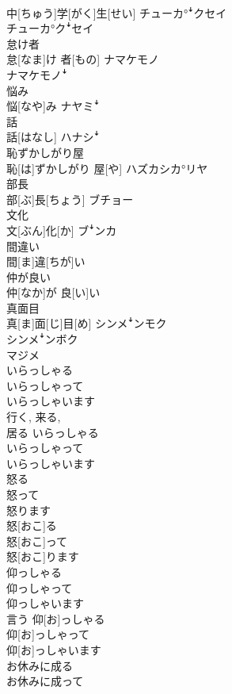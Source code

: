 \documentclass[8pt]{extreport}
\begin{document}
\begin{CJK}{UTF8}{min}
\\	中[ちゅう]学[がく]生[せい]	チューカ°ꜜクセイ 
\\	チューカ°クꜜセイ
\\	怠け者	
\\	怠[なま]け 者[もの]	ナマケモノ 
\\	ナマケモノꜜ
\\	悩み	
\\	悩[なや]み	ナヤミꜜ
\\	話	
\\	話[はなし]	ハナシꜜ
\\	恥ずかしがり屋	
\\	恥[は]ずかしがり 屋[や]	ハズカシカ°リヤ
\\	部長	
\\	部[ぶ]長[ちょう]	ブチョー
\\	文化	
\\	文[ぶん]化[か]	ブꜜンカ
\\	間違い	
\\	間[ま]違[ちが]い	
\\	仲が良い	
\\	仲[なか]が 良[い]い	
\\	真面目	
\\	真[ま]面[じ]目[め]	シンメꜜンモク 
\\	シンメꜜンボク 
\\	マジメ
\\	いらっしゃる 
\\	いらっしゃって 
\\	いらっしゃいます	
\\	行く, 来る, 
\\	居る	いらっしゃる 
\\	いらっしゃって 
\\	いらっしゃいます	
\\	怒る 
\\	怒って 
\\	怒ります	
\\	怒[おこ]る 
\\	怒[おこ]って 
\\	怒[おこ]ります	
\\	仰っしゃる 
\\	仰っしゃって 
\\	仰っしゃいます	
\\	言う	仰[お]っしゃる 
\\	仰[お]っしゃって 
\\	仰[お]っしゃいます	
\\	お休みに成る 
\\	お休みに成って 

\end{CJK}
\end{document}
